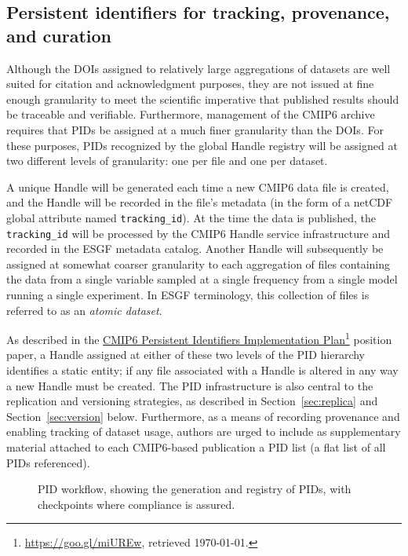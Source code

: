 \documentclass[gmd,manuscript]{copernicus}
\newcommand{\urlref}[2] {\href{#1}{#2}\footnote{\url{#1}, retrieved \today.}}
\begin{document}
\subsection{Persistent identifiers for tracking, provenance, and
  curation}
\label{sec:pid}

Although the DOIs assigned to relatively large aggregations of
datasets are well suited for citation and acknowledgment purposes,
they are not issued at fine enough granularity to meet the scientific
imperative that published results should be traceable and verifiable.
Furthermore, management of the CMIP6 archive requires that PIDs be
assigned at a much finer granularity than the DOIs. For these
purposes, PIDs recognized by the global Handle registry will be
assigned at two different levels of granularity: one per file and 
one per dataset.

A unique Handle will be generated each time a new CMIP6 data file is
created, and the Handle will be recorded in the file's metadata (in
the form of a netCDF global attribute named \texttt{tracking\_id}). At
the time the data is published, the \texttt{tracking\_id} will be
processed by the CMIP6 Handle service infrastructure and recorded in
the ESGF metadata catalog. Another Handle will subsequently be
assigned at somewhat coarser granularity to each aggregation of files
containing the data from a single variable sampled at a single
frequency
from a single model running a single experiment. In ESGF terminology,
this collection of files is referred to as an \emph{atomic dataset}.

As described in the \urlref{https://goo.gl/miUREw}{CMIP6 Persistent
  Identifiers Implementation Plan} position paper, a Handle assigned
at either of these two levels of the PID hierarchy identifies a static
entity; if any file associated with a Handle is altered in any way a
new Handle must be created. The PID infrastructure is also central to
the replication and versioning strategies, as described in
Section~\ref{sec:replica} and Section~\ref{sec:version} below.
Furthermore, as a means of recording provenance and enabling tracking
of dataset usage, authors are urged to include as supplementary
material attached to each CMIP6-based publication a PID list (a flat
list of all PIDs referenced).

\begin{figure*}
  \begin{center}
  \end{center}
  \caption{PID workflow, showing the generation and registry of PIDs,
    with checkpoints where compliance is assured.}
  \label{fig:pidflow}
\end{figure*}
\end{document}
